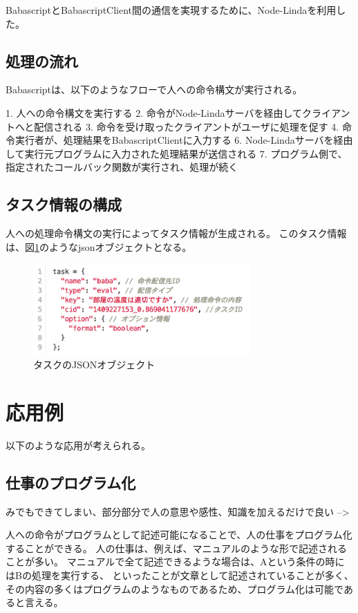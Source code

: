 \documentclass[twoside]{wiss}
\begin{document}
BabascriptとBabascriptClient間の通信を実現するために、Node-Linda\cite{linda}を利用した。

\subsection{処理の流れ}

Babascriptは、以下のようなフローで人への命令構文が実行される。

1. 人への命令構文を実行する
2. 命令がNode-Lindaサーバを経由してクライアントへと配信される
3. 命令を受け取ったクライアントがユーザに処理を促す
4. 命令実行者が、処理結果をBabascriptClientに入力する
6. Node-Lindaサーバを経由して実行元プログラムに入力された処理結果が送信される
7. プログラム側で、指定されたコールバック関数が実行され、処理が続く

\subsection{タスク情報の構成}

人への処理命令構文の実行によってタスク情報が生成される。
このタスク情報は、図\ref{task}のようなjsonオブジェクトとなる。

\begin{figure}[!h]
  \includegraphics[width=83mm, bb=0 0 755 318]{./images/task.png}
  \caption{タスクのJSONオブジェクト}  
  \label{task}
\end{figure}

\section{応用例}

以下のような応用が考えられる。

\subsection{仕事のプログラム化}
みでもできてしまい、部分部分で人の意思や感性、知識を加えるだけで良い -->

人への命令がプログラムとして記述可能になることで、人の仕事をプログラム化することができる。
人の仕事は、例えば、マニュアルのような形で記述されることが多い。
マニュアルで全て記述できるような場合は、Aという条件の時にはBの処理を実行する、
といったことが文章として記述されていることが多く、その内容の多くはプログラムのようなものであるため、プログラム化は可能であると言える。
\end{document}
